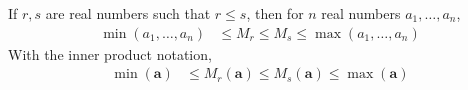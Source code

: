 \documentclass{subfile}
\begin{document}
		\begin{theorem}
			If $r,s$ are real numbers such that $r\leq s$, then for $n$ real numbers $a_1,\ldots,a_n$,
				\begin{align*}
					\min(a_1,\ldots,a_n)
						& \leq M_r\leq M_s\leq\max(a_1,\ldots,a_n)
				\end{align*}
			With the inner product notation,
				\begin{align*}
					\min{(\mathbf{a})}
						& \leq M_r(\mathbf{a})\leq M_s(\mathbf{a})\leq\max{(\mathbf{a})}
				\end{align*}
		\end{theorem}
\end{document}
